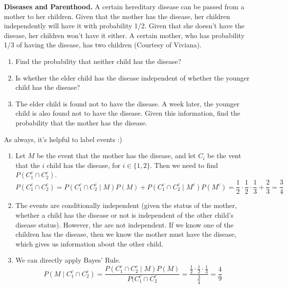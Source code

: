 \documentclass[11pt]{article}
\begin{document}
\begin{exercise}
\textbf{Diseases and Parenthood.} A certain hereditary disease can be passed from a mother to her children. Given that the mother has the disease, her children independently will have it with probability 1/2. Given that she doesn't have the disease, her children won’t have it either. A certain mother, who has probability 1/3 of having the disease, has two children (Courtesy of Viviana).
\begin{enumerate}
\item Find the probability that neither child has the disease?
\item Is whether the elder child has the disease independent of whether the younger child has the
disease?
\item The elder child is found not to have the disease. A week later, the younger child is also found
not to have the disease. Given this information, find the probability that the mother has the disease.
\end{enumerate}
\end{exercise}
\begin{solution}
As always, it's helpful to label events :)
\begin{enumerate}
\item Let $M$ be the event that the mother has the disease, and let $C_i$ be the vent that the $i$ child has the disease, for $i \in \{1,2\}$. Then we need to find $P(C_1^c \cap C_2^c)$.
$$
P(C_1^c \cap C_2^c) = P(C_1^c \cap C_2^c \mid M)P(M) + P(C_1^c \cap C_2^c \mid M^c)P(M^c) = \frac{1}{2}\cdot\frac{1}{2}\cdot\frac{1}{3} + \frac{2}{3} = \frac{3}{4}
$$
\item The events are conditionally independent (given the status of the mother, whether a child has the disease or not is independent of the other child's disease status). However, the are not independent. If we know one of the children has the disease, then we know the mother must have the disease, which gives us information about the other child.
\item We can directly apply Bayes' Rule.
$$
P(M \mid C_1^c \cap C_2^c) = \frac{P(C_1^c \cap C_2^c \mid M)P(M)}{P(C_1^c \cap C_2^c} = \frac{\frac{1}{2} \cdot \frac{1}{2} \cdot \frac{1}{3}}{\frac{3}{4}} = \frac{4}{9}
$$
\end{enumerate}
\end{solution}
\end{document}
